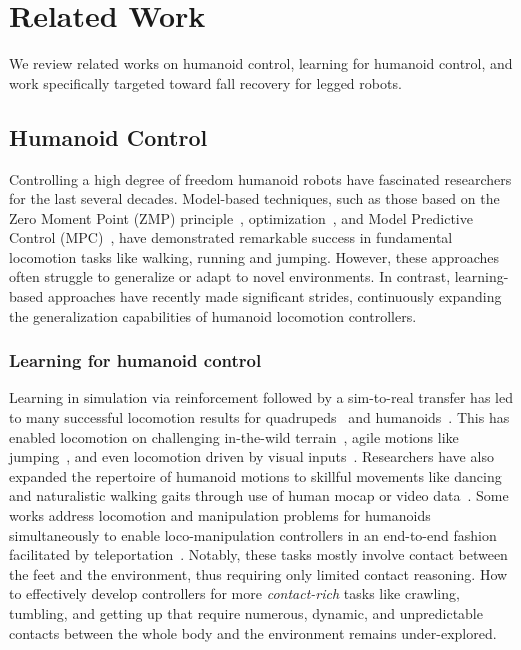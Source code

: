 \section{Related Work}
We review related works on humanoid control, learning for humanoid control, and work specifically targeted toward fall recovery for legged robots.

\subsection{Humanoid Control}
Controlling a high degree of freedom humanoid robots have fascinated researchers for the last several decades. 
Model-based techniques, such as those based on the Zero Moment Point (ZMP) principle~\cite{ZeroMoment04,HondaHumanoid98,ASIMO02,WalkMan17}, optimization~\cite{OptimizationBasedLocomotion16,bookwalkingrunning2023,BipedalRunning23}, and Model Predictive Control (MPC)~\cite{MITHumanoid21,galliker2022planar,DynamicLocomotionMITConvexMPC18,FullOrderSamplingBasedMPC24}, have demonstrated remarkable success in fundamental locomotion tasks like walking, running and jumping.
However, these approaches often struggle to generalize or adapt to novel environments.
In contrast, learning-based approaches have recently made significant strides, continuously expanding the generalization capabilities of humanoid locomotion controllers.


\subsubsection{Learning for humanoid control}
Learning in simulation via reinforcement followed by a sim-to-real transfer has led to many successful locomotion results for quadrupeds~\cite{AgileDynamicMotorSkills19, RMA21} and humanoids~\cite{RealWorldHumanoidLocomotionScienceRobotics24, HumanoidLocomotionNextTokenPrediction24, HumanoidLocomotionChallengingTerrain24, advancinglocomotion2024, LCP24, KinodynamicFabrics23}. This has enabled locomotion on challenging in-the-wild terrain~\cite{HumanoidLocomotionChallengingTerrain24,DenoisingWorldModel24}, agile motions like jumping~\cite{BipedalJumpingControl23,WoCoCo24}, and even locomotion driven by visual inputs~\cite{HumanoidParkour24,long2024learning}. Researchers have also expanded the repertoire of humanoid motions to skillful movements like dancing and naturalistic walking gaits through use of human mocap or video data~\cite{Exbody2_24, Exbody24, UH1_24, Hover24}. Some works address locomotion and manipulation problems for humanoids simultaneously to enable loco-manipulation controllers in an end-to-end fashion facilitated by teleportation~\cite{OmniH2O24,HumanPlus24,MobileTelevision24}. 
Notably, these tasks mostly involve contact between the feet and the environment, thus requiring only limited contact reasoning. How to effectively develop controllers for more \textit{contact-rich} tasks like crawling, tumbling, and getting up that require numerous, dynamic, and unpredictable contacts between the whole body and the environment remains under-explored.

